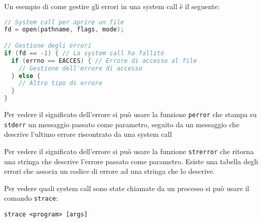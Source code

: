 \documentclass[a4paper]{article}
\begin{document}
\begin{example}
  Un esempio di come gestire gli errori in una system call è il seguente:
\begin{lstlisting}[language=c]
// System call per aprire un file
fd = open(pathname, flags, mode);

// Gestione degli errori
if (fd == -1) { // La system call ha fallito
  if (errno == EACCES) { // Errore di accesso al file
    // Gestione dell'errore di accesso
  } else {
    // Altro tipo di errore
  }
}
\end{lstlisting}
\end{example}
Per vedere il significato dell'errore si
può usare la funzione \texttt{perror} che stampa su \texttt{stderr} un messaggio passato
come parametro, seguito da un messaggio che descrive l'ultimo errore riscontrato da una 
system call

\vspace{1em}
\noindent
Per vedere il significato dell'errore si può usare la funzione \texttt{strerror} che
ritorna una stringa che descrive l'errore passato come parametro. Esiste una tabella
degli errori che associa un codice di errore ad una stringa che lo descrive.

\vspace{1em}
\noindent
Per vedere quali system call sono state chiamate da un processo si può usare il comando
\texttt{strace}:
\begin{lstlisting}
strace <program> [args]
\end{lstlisting}
\end{document}
